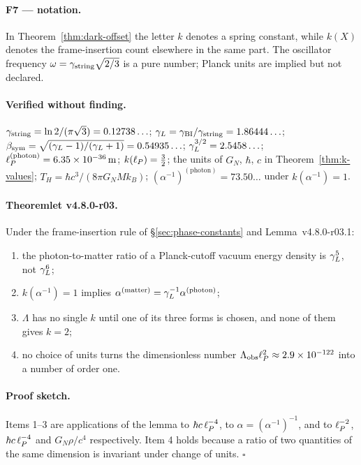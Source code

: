 \paragraph{F7 --- notation.}
In Theorem~\ref{thm:dark-offset} the letter \(k\) denotes a spring constant, while \(k(X)\)
denotes the frame-insertion count elsewhere in the same part.  The oscillator frequency
\(\omega=\gamma_{\mathrm{string}}\sqrt{2/3}\) is a pure number; Planck units are implied but not declared.

\paragraph{Verified without finding.}
\(\gamma_{\mathrm{string}}=\ln2/(\pi\sqrt3)=0.12738\ldots\);
\(\gamma_L=\gamma_{\mathrm{BI}}/\gamma_{\mathrm{string}}=1.86444\ldots\);
\(\beta_{\mathrm{sym}}=\sqrt{(\gamma_L-1)/(\gamma_L+1)}=0.54935\ldots\);
\(\gamma_L^{3/2}=2.5458\ldots\);
\(\ell_P^{(\mathrm{photon})}=6.35\times10^{-36}\,\mathrm{m}\);
\(k(\ell_P)=\tfrac32\);
the units of \(G_N\), \(\hbar\), \(c\) in Theorem~\ref{thm:k-values};
\(T_H=\hbar c^3/(8\pi G_NMk_B)\);
\((\alpha^{-1})^{(\mathrm{photon})}=73.50\ldots\) under \(k(\alpha^{-1})=1\).

\paragraph{Theoremlet v4.8.0-r03.}
Under the frame-insertion rule of \S\ref{sec:phase-constants} and Lemma~v4.8.0-r03.1:
\begin{enumerate}[leftmargin=2em]
 \item the photon-to-matter ratio of a Planck-cutoff vacuum energy density is \(\gamma_L^{5}\), not
 \(\gamma_L^{6}\);
 \item \(k(\alpha^{-1})=1\) implies \(\alpha^{(\mathrm{matter})}=\gamma_L^{-1}\alpha^{(\mathrm{photon})}\);
 \item \(\Lambda\) has no single \(k\) until one of its three forms is chosen, and none of them
 gives \(k=2\);
 \item no choice of units turns the dimensionless number \(\Lambda_{\mathrm{obs}}\ell_P^2\approx
 2.9\times10^{-122}\) into a number of order one.
\end{enumerate}

\paragraph{Proof sketch.}
Items 1--3 are applications of the lemma to \(\hbar c\,\ell_P^{-4}\), to \(\alpha=(\alpha^{-1})^{-1}\),
and to \(\ell_P^{-2}\), \(\hbar c\,\ell_P^{-4}\) and \(G_N\rho/c^4\) respectively.  Item 4 holds because a
ratio of two quantities of the same dimension is invariant under change of units.  \(\square\)

